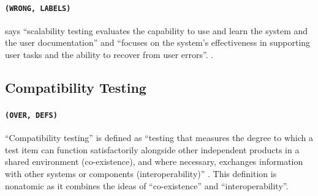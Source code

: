 \paragraph{\texttt{(WRONG, LABELS)}}

\citeauthor{SWEBOK2024} \citeyearpar[p.~5\=/9]{SWEBOK2024} says ``scalability
testing evaluates the capability to use and learn the system and the user
documentation'' and ``focuses on the system's effectiveness in supporting user
tasks and the ability to recover from user errors''. \swebokScalDef{}.



\subsection{Compatibility Testing}\label{compat-flaw}

\paragraph{\texttt{(OVER, DEFS)}}
``Compatibility testing'' is defined as ``testing that measures the
degree to which a test item can function satisfactorily alongside
other independent products in a shared environment (co-existence),
and where necessary, exchanges information with other systems or
components (interoperability)'' \citep[p.~3]{IEEE2022}. This
definition is nonatomic as it combines the ideas of ``co-existence''
and ``interoperability''.

